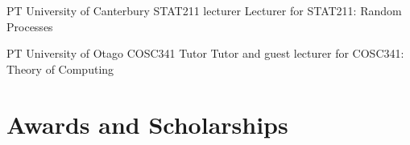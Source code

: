 \documentclass[10pt]{article} %
\begin{document}
\begin{paracol}{2}
{PT} %
{University of Canterbury} %
{STAT211 lecturer} %
{Lecturer for STAT211: Random Processes	
} %

{PT} %
{University of Otago} %
{COSC341 Tutor} %
{Tutor and guest lecturer for COSC341: Theory of Computing	
} %










%
%
%
%
%
%

\section{Awards and Scholarships}


\end{paracol}
\end{document}
